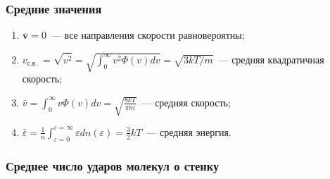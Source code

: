\subsubsection{Средние значения}
\begin{enumerate}
	\item $\overline{\mathbf{v}}=0$~--- все направления скорости равновероятны;
	\item $v_{\text {с.к. }}=\sqrt{\overline{v^2}}=\sqrt{\int_0^{\infty} v^2 \Phi(v) d v}=\sqrt{3 k T / m}$~--- средняя квадратичная скорость;
	\item $\bar{v}=\int_0^{\infty} v \Phi(v) d v=\sqrt{\frac{8 k T}{\pi m}}$~--- средняя скорость;
	\item $\bar{\varepsilon}=\frac{1}{n} \int_{\varepsilon=0}^{\varepsilon=\infty} \varepsilon d n(\varepsilon)=\frac{3}{2} k T$~--- средняя энергия.
\end{enumerate}

\subsubsection*{Среднее число ударов молекул о стенку}


